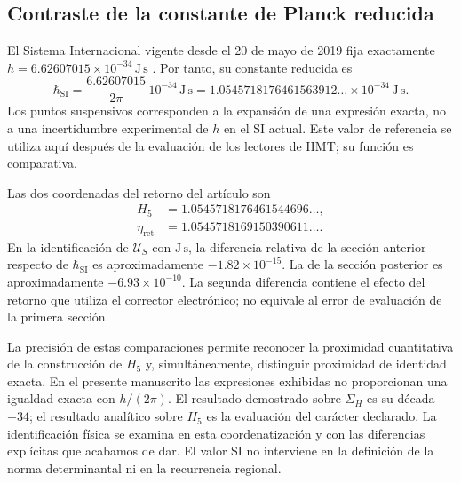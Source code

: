 \subsection{Contraste de la constante de Planck reducida}
\label{sec:revision-planck-contraste}

El Sistema Internacional vigente desde el 20 de mayo de 2019 fija
exactamente \(h=6.62607015\times10^{-34}\,\mathrm{J\,s}\)
\cite{bipm2018}. Por tanto, su constante reducida es
\[
 \hbar_{\mathrm{SI}}=\frac{6.62607015}{2\pi}\,10^{-34}\,
 \mathrm{J\,s}
 =1.0545718176461563912\ldots\times10^{-34}\,\mathrm{J\,s}.
\]
Los puntos suspensivos corresponden a la expansión de una expresión
exacta, no a una incertidumbre experimental de \(h\) en el SI actual.
Este valor de referencia se utiliza aquí después de la evaluación de
los lectores de HMT; su función es comparativa.

Las dos coordenadas del retorno del artículo son
\begin{align*}
 H_5&=1.0545718176461544696\ldots,\\
 \eta_{\mathrm{ret}}&=1.0545718169150390611\ldots.
\end{align*}
En la identificación de \(\mathcal U_S\) con \(\mathrm{J\,s}\), la
diferencia relativa de la sección anterior respecto de
\(\hbar_{\mathrm{SI}}\) es aproximadamente \(-1.82\times10^{-15}\).
La de la sección posterior es aproximadamente \(-6.93\times10^{-10}\).
La segunda diferencia contiene el efecto del retorno que utiliza el
corrector electrónico; no equivale al error de evaluación de la
primera sección.

La precisión de estas comparaciones permite reconocer la proximidad
cuantitativa de la construcción de \(H_5\) y, simultáneamente, distinguir
proximidad de identidad exacta. En el presente manuscrito las expresiones
exhibidas no proporcionan una igualdad exacta con \(h/(2\pi)\).
El resultado demostrado sobre \(\Sigma_H\) es su década \(-34\);
el resultado analítico sobre \(H_5\) es la evaluación del carácter
declarado. La identificación física se examina en esta coordenatización y con las
diferencias explícitas que acabamos de dar. El valor SI no interviene
en la definición de la norma determinantal ni en la recurrencia regional.
